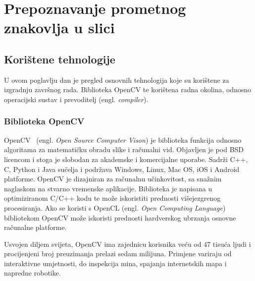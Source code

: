 \newpage
\setcounter{figure}{0}

\section{Prepoznavanje prometnog znakovlja u slici} %
\label{sec:Tehnologija i teorija}

\subsection{Korištene tehnologije}
U ovom poglavlju dan je pregled osnovnih tehnologija koje su korištene za izgradnju završnog rada. Biblioteka OpenCV te korištena radna okolina, odnosno operacijski sustav i prevoditelj (engl. \textit{compiler}).

\subsubsection{Biblioteka OpenCV} %
\label{sub:Biblioteka OpenCV}

OpenCV~\cite{opencv_library} (engl. \textit{Open Source Computer Vison})
je biblioteka funkcija odnosno algoritama za matematičku obradu slike i
računalni vid.  Objavljen je pod BSD licencom i stoga je slobodan za
akademske i komercijalne uporabe. Sadrži C++, C, Python i Java sučelja i
podržava Windows, Linux, Mac OS, iOS i Android platforme. OpenCV je
dizajniran za računalnu učinkovitost, sa snažnim naglaskom na stvarno
vremenske aplikacije. Biblioteka je napisana u optimiziranom C/C++ kodu
te može iskoristiti prednosti višejezgrenog procesiranja. Ako se koristi
s OpenCL (engl. \textit{Open Computing Language}) bibliotekom OpenCV
može iskoristi prednosti hardverskog ubrzanja osnovne računalne
platforme.

Usvojen diljem svijeta, OpenCV ima zajednicu korisnika veću od 47 tisuća
ljudi i procijenjeni broj preuzimanja prelazi sedam milijuna. Primjene
variraju od interaktivne umjetnosti, do inspekcija mina, spajanja
internetskih mapa i napredne robotike.

